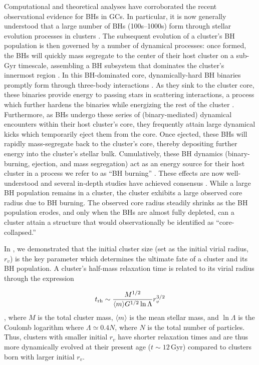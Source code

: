 \documentclass[twocolumn,tighten]{aastex63}
\begin{document}
Computational and theoretical analyses have corroborated the recent observational evidence for BHs in GCs. In particular, it is now generally understood that a large number of BHs (100s--1000s) form through stellar evolution processes in clusters \citep[e.g.,][]{Kroupa2001,Morscher2015}. The subsequent evolution of a cluster's BH population is then governed by a number of dynamical processes: once formed, the BHs will quickly mass segregate to the center of their host cluster on a sub-Gyr timescale, assembling a BH subsystem that dominates the cluster's innermost region \citep[e.g.,][]{Spitzer1969,Kulkarni1993,Sigurdsson1993}. In this BH-dominated core, dynamically-hard BH binaries promptly form through three-body interactions \citep[e.g.,][]{Morscher2015}. As they sink to the cluster core, these binaries provide energy to passing stars in scattering interactions, a process which further hardens the binaries while energizing the rest of the cluster \citep[e.g.,][]{HeggieHut2003,BreenHeggie2013}. Furthermore, as BHs undergo these series of (binary-mediated) dynamical encounters within their host cluster's core, they frequently attain large dynamical kicks which temporarily eject them from the core. Once ejected, these BHs will rapidly mass-segregate back to the cluster's core, thereby depositing further energy into the cluster's stellar bulk. Cumulatively, these BH dynamics (binary-burning, ejection, and mass segregation) act as an energy source for their host cluster in a process we refer to as ``BH burning'' \citep[for review, see][]{Kremer2019d}. These effects are now well-understood and several in-depth studies have achieved consensus \citep{Merritt2004,Mackey2007,Mackey2008,BreenHeggie2013,Peuten2016,Wang2016,ArcaSedda2018,Kremer2018b,Zocchi2019,Kremer2019a,Antonini2019}. While a large BH population remains in a cluster, the cluster exhibits a large observed core radius due to BH burning. The observed core radius steadily shrinks as the BH population erodes, and only when the BHs are almost fully depleted, can a cluster attain a structure that would observationally be identified as ``core-collapsed.''

In \citet{Kremer2019a}, we demonstrated that the initial cluster size (set as the initial virial radius, $r_v$) is the key parameter which determines the ultimate fate of a cluster and its BH population. A cluster's half-mass relaxation time is related to its virial radius through the expression

\begin{equation}
\label{eq:relaxationtime}
t_{\rm{rh}} \sim \frac{M^{1/2}}{\langle m \rangle G^{1/2}\ln \Lambda} r_v^{3/2}
\end{equation}
\citep[Equation 2-63 of][]{Spitzer1987}, where $M$ is the total cluster mass, $\langle m \rangle$ is the mean stellar mass, and $\ln \Lambda$ is the Coulomb logarithm where $\Lambda \simeq 0.4 N$, where $N$ is the total number of particles. Thus, clusters with smaller initial $r_v$ have shorter relaxation times and are thus more dynamically evolved at their present age ($t\sim12\,$Gyr) compared to clusters born with larger initial $r_v$.
\end{document}
